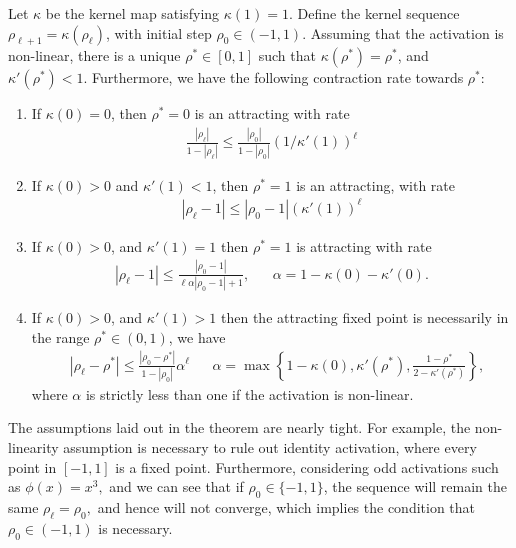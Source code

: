 \begin{theorem}
Let $\kappa$ be the kernel map satisfying $\kappa(1)=1$. Define the kernel sequence $\rho_{\ell+1}=\kappa(\rho_\ell)$, with initial step $\rho_0 \in (-1,1)$. Assuming that the activation is non-linear, there is a unique $\rho^*\in[0,1]$ such that $\kappa(\rho^*) = \rho^*$, and $\kappa'(\rho^*) < 1.$ Furthermore, we have the following contraction rate towards $\rho^*$:
\begin{enumerate}
    \item If $\kappa(0)=0$, then $\rho^*=0$ is an attracting with rate 
    \begin{align}
    \frac{|\rho_\ell|}{1-|\rho_\ell|} \le \frac{|\rho_0|}{1-|\rho_0|} (1/\kappa'(1))^\ell
    \end{align}
    \item If $\kappa(0)>0$ and $\kappa'(1)<1$, then $\rho^*=1$ is an attracting, with rate 
    \begin{align}
    |\rho_\ell-1| \le |\rho_0-1| (\kappa'(1))^\ell
    \end{align}
    \item If $\kappa(0) > 0$, and $\kappa'(1)=1$ then  $\rho^*=1$ is attracting with rate 
    \begin{align}
    |\rho_\ell-1| \le \frac{|\rho_0-1|}{\ell\alpha|\rho_0-1|+1}, && \alpha = 1-\kappa(0)-\kappa'(0).
    \end{align}
    \item If $\kappa(0) > 0$, and $\kappa'(1)>1$ then the attracting fixed point is necessarily in the range $\rho^*\in(0,1)$, we have  
    \begin{align}
    &|\rho_\ell-\rho^*| \le \frac{|\rho_0-\rho^*|}{1-|\rho_0|}\alpha^\ell && \alpha = \max\left\{1-\kappa(0),\kappa'(\rho^*),\frac{1-\rho^*}{2-\kappa'(\rho^*)}\right\},
    \end{align}
    where $\alpha$ is strictly less than one if the activation is non-linear.
\end{enumerate}
\end{theorem}

\begin{remark}
The assumptions laid out in the theorem are nearly tight. For example, the non-linearity assumption is necessary to rule out identity activation, where every point in $[-1,1]$ is a fixed point. Furthermore, considering odd activations such as $\phi(x) = x^3,$ and we can see that if $\rho_0\in\{-1,1\}$, the sequence will remain the same $\rho_\ell=\rho_0,$ and hence will not converge, which implies the condition that $\rho_0\in(-1,1)$ is necessary. 
\end{remark}

